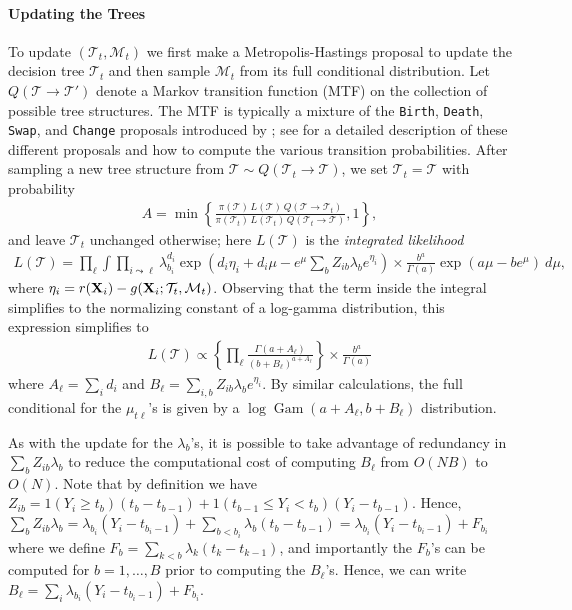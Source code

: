 \documentclass[12pt]{article}
\newcommand{\Gam}{\operatorname{Gam}}
\newcommand{\sM}{\mathcal M}
\newcommand{\Tree}{\mathcal T}
\newcommand{\bfX}{{\bf X}}
\begin{document}
\paragraph{Updating the Trees}
To update $(\Tree_t, \sM_t)$ we first make a Metropolis-Hastings proposal to 
update the decision tree $\Tree_t$ and then sample $\sM_t$ from its full 
conditional distribution. Let $Q(\Tree \to \Tree')$ denote a Markov transition 
function (MTF) on the collection of possible tree structures. The MTF is 
typically a mixture of the \texttt{Birth}, \texttt{Death}, \texttt{Swap}, and 
\texttt{Change} proposals introduced by \citet{chipman1998bayesian}; see 
\citet{kapelner2014bartmachine} for a detailed description of these different 
proposals and how to compute the various transition probabilities. After 
sampling a new tree structure from $\Tree \sim Q(\Tree_t \to \Tree)$, we set 
$\Tree_t = \Tree$ with probability
\begin{align*}
    A = \min\left\{\frac{\pi(\Tree) \, L(\Tree) \, Q(\Tree \to \Tree_t)}
         {\pi(\Tree_t) \, L(\Tree_t) \, Q(\Tree_t \to \Tree)}, 1 \right\},
\end{align*}
and leave $\Tree_t$ unchanged otherwise; here $L(\Tree)$ is the 
\emph{integrated likelihood}
\begin{align*}
    L(\Tree) = \prod_{\ell} \int \prod_{i \leadsto \ell}
      \lambda_{b_i}^{d_i} \exp\left(d_i \eta_i + d_i \mu - e^\mu \sum_b Z_{ib} \lambda_b e^{\eta_i}\right) \times \frac{b^a}{\Gamma(a)} \exp(a \mu - b e^\mu) \ d\mu,
\end{align*}
where $\eta_i = r(\bfX_i) - g(\bfX_i; \Tree_t, \sM_t)$. Observing that the term 
inside the integral simplifies to the normalizing constant of a log-gamma 
distribution, this expression simplifies to
\begin{align*}
    L(\Tree) \propto 
    \left\{\prod_\ell \frac{\Gamma(a + A_\ell)}{(b + B_\ell)^{a + A_\ell}}\right\}
    \times \frac{b^a}{\Gamma(a)}
\end{align*}
where $A_\ell = \sum_i d_i$ and  $B_\ell = \sum_{i,b} Z_{ib} \lambda_b e^{\eta_i}$. By similar calculations, the  full conditional for the $\mu_{t\ell}$'s is given by a $\log \Gam(a + A_\ell, b +  B_\ell)$ distribution.

As with the update for the $\lambda_b$'s, it is possible to take advantage of redundancy in $\sum_b Z_{ib} \lambda_b$ to reduce the computational cost of  computing $B_\ell$ from $O(NB)$ to $O(N)$. Note that by definition we have  $Z_{ib} = 1(Y_i \ge t_b) (t_b - t_{b-1}) + 1(t_{b-1} \le Y_i < t_b) (Y_i - t_{b- 1})$. Hence, $\sum_b Z_{ib} \lambda_b = \lambda_{b_i} (Y_i - t_{b_i - 1}) +  \sum_{b < b_i} \lambda_b (t_b - t_{b-1}) = \lambda_{b_i} (Y_i - t_{b_i - 1}) +  F_{b_i}$ where we define $F_b = \sum_{k < b} \lambda_k (t_k - t_{k-1})$, and importantly the $F_b$'s can be computed for $b = 1,\ldots, B$ prior to computing the $B_\ell$'s. Hence, we can write $B_\ell = \sum_i \lambda_{b_i}(Y_i - t_{b_i - 1}) + F_{b_i}$.
\end{document}
